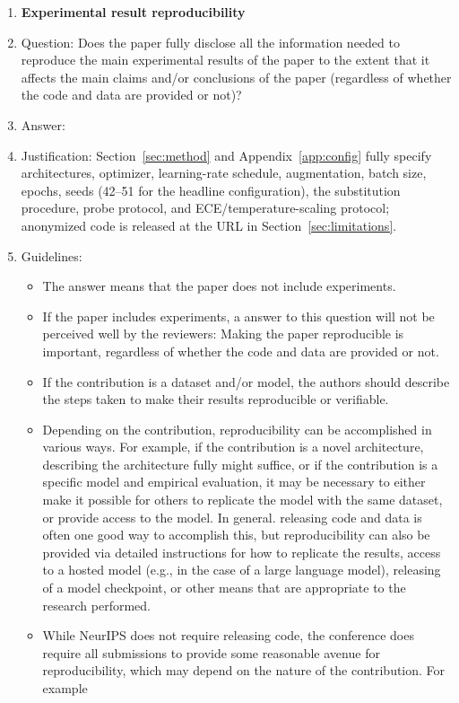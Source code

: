 \documentclass{article}
\begin{document}
\begin{enumerate}
    \item {\bf Experimental result reproducibility}
    \item[] Question: Does the paper fully disclose all the information needed to reproduce the main experimental results of the paper to the extent that it affects the main claims and/or conclusions of the paper (regardless of whether the code and data are provided or not)?
    \item[] Answer: \answerYes{}
    \item[] Justification: Section~\ref{sec:method} and Appendix~\ref{app:config} fully specify architectures, optimizer, learning-rate schedule, augmentation, batch size, epochs, seeds (42--51 for the headline configuration), the substitution procedure, probe protocol, and ECE/temperature-scaling protocol; anonymized code is released at the URL in Section~\ref{sec:limitations}.
    \item[] Guidelines:
    \begin{itemize}
        \item The answer \answerNA{} means that the paper does not include experiments.
        \item If the paper includes experiments, a \answerNo{} answer to this question will not be perceived well by the reviewers: Making the paper reproducible is important, regardless of whether the code and data are provided or not.
        \item If the contribution is a dataset and\slash or model, the authors should describe the steps taken to make their results reproducible or verifiable.
        \item Depending on the contribution, reproducibility can be accomplished in various ways. For example, if the contribution is a novel architecture, describing the architecture fully might suffice, or if the contribution is a specific model and empirical evaluation, it may be necessary to either make it possible for others to replicate the model with the same dataset, or provide access to the model. In general. releasing code and data is often one good way to accomplish this, but reproducibility can also be provided via detailed instructions for how to replicate the results, access to a hosted model (e.g., in the case of a large language model), releasing of a model checkpoint, or other means that are appropriate to the research performed.
        \item While NeurIPS does not require releasing code, the conference does require all submissions to provide some reasonable avenue for reproducibility, which may depend on the nature of the contribution. For example

\end{itemize}
\end{enumerate}
\end{document}
